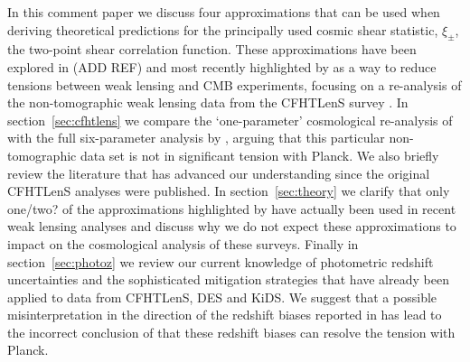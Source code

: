 \documentclass[preprint]{aastex}
\begin{document}
In this comment paper we discuss four approximations that can be used when deriving theoretical predictions for the principally used cosmic shear statistic, $\xi_\pm$, the two-point shear correlation function.   These approximations have been explored in (ADD REF) and most recently highlighted by \citet{kitching/etal:2016} as a way to reduce tensions between weak lensing and CMB experiments, focusing on a re-analysis of the non-tomographic weak lensing data from the CFHTLenS survey \citet{kilbinger/etal:2013}.    In section~\ref{sec:cfhtlens} we compare the `one-parameter' cosmological re-analysis of \citet{kitching/etal:2016} with the full six-parameter analysis by \citet{kilbinger/etal:2013}, arguing that this particular non-tomographic data set is not in significant tension with Planck.  We also briefly review the literature that has advanced our understanding since the original CFHTLenS analyses were published.  In section~\ref{sec:theory} we clarify that only one/two? of the approximations highlighted by \citet{kitching/etal:2016} have actually been used in recent weak lensing analyses \citet{joudaki/etal:2016, hildebrandt/etal:2016, joudaki/etal:2017} and discuss why we do not expect these approximations to impact on the cosmological analysis of these surveys.    Finally in section~\ref{sec:photoz} we review our current knowledge of photometric redshift uncertainties and the sophisticated mitigation strategies that have already been applied to data from CFHTLenS, DES and KiDS.  We suggest that a possible misinterpretation in the direction of the redshift biases reported in \citet{choi/etal:2016} has lead to the incorrect conclusion of \citet{kitching/etal:2016} that these redshift biases can resolve the tension with Planck.  

\end{document}
